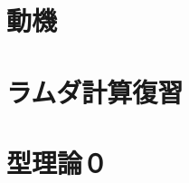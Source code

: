 \documentclass[dvipdfmx]{jsarticle}
\begin{document}
\section{動機}

\newpage

\section{ラムダ計算復習}

\newpage

\section{型理論０}

\newpage

%
%
\end{document}
